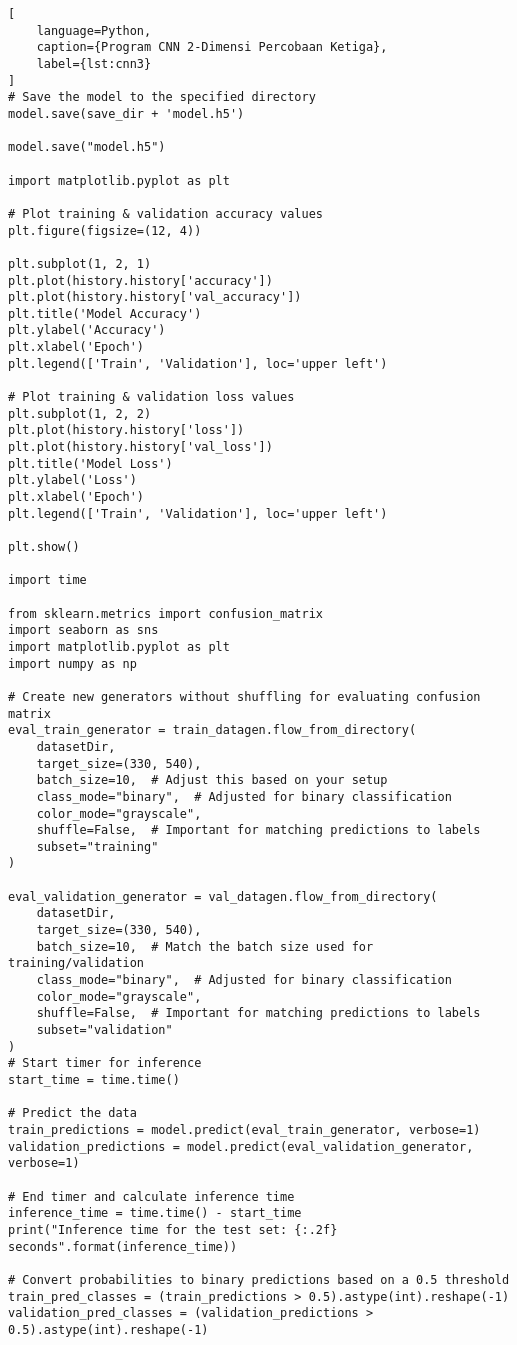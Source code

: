 \begin{lstlisting}[
    language=Python,
    caption={Program CNN 2-Dimensi Percobaan Ketiga},
    label={lst:cnn3}
]
# Save the model to the specified directory
model.save(save_dir + 'model.h5')

model.save("model.h5")

import matplotlib.pyplot as plt

# Plot training & validation accuracy values
plt.figure(figsize=(12, 4))

plt.subplot(1, 2, 1)
plt.plot(history.history['accuracy'])
plt.plot(history.history['val_accuracy'])
plt.title('Model Accuracy')
plt.ylabel('Accuracy')
plt.xlabel('Epoch')
plt.legend(['Train', 'Validation'], loc='upper left')

# Plot training & validation loss values
plt.subplot(1, 2, 2)
plt.plot(history.history['loss'])
plt.plot(history.history['val_loss'])
plt.title('Model Loss')
plt.ylabel('Loss')
plt.xlabel('Epoch')
plt.legend(['Train', 'Validation'], loc='upper left')

plt.show()

import time

from sklearn.metrics import confusion_matrix
import seaborn as sns
import matplotlib.pyplot as plt
import numpy as np

# Create new generators without shuffling for evaluating confusion matrix
eval_train_generator = train_datagen.flow_from_directory(
    datasetDir,
    target_size=(330, 540),
    batch_size=10,  # Adjust this based on your setup
    class_mode="binary",  # Adjusted for binary classification
    color_mode="grayscale",
    shuffle=False,  # Important for matching predictions to labels
    subset="training"
)

eval_validation_generator = val_datagen.flow_from_directory(
    datasetDir,
    target_size=(330, 540),
    batch_size=10,  # Match the batch size used for training/validation
    class_mode="binary",  # Adjusted for binary classification
    color_mode="grayscale",
    shuffle=False,  # Important for matching predictions to labels
    subset="validation"
)
# Start timer for inference
start_time = time.time()

# Predict the data
train_predictions = model.predict(eval_train_generator, verbose=1)
validation_predictions = model.predict(eval_validation_generator, verbose=1)

# End timer and calculate inference time
inference_time = time.time() - start_time
print("Inference time for the test set: {:.2f} seconds".format(inference_time))

# Convert probabilities to binary predictions based on a 0.5 threshold
train_pred_classes = (train_predictions > 0.5).astype(int).reshape(-1)
validation_pred_classes = (validation_predictions > 0.5).astype(int).reshape(-1)


\end{lstlisting}
